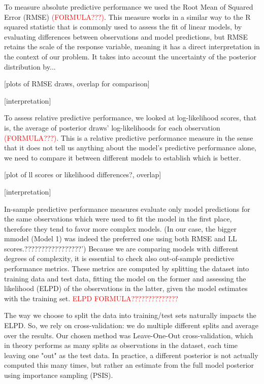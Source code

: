 \documentclass[12pt]{article}
\begin{document}
To measure absolute predictive performance we used the Root Mean of Squared Error (RMSE)
\textcolor{red}{(FORMULA???)}.
This measure works in a similar way to the R squared statistic that is commonly used to assess the fit of linear models, by evaluating differences between observations and model predictions, but RMSE retains the scale of the response variable, meaning it has a direct interpretation in the context of our problem.
It takes into account the uncertainty of the posterior distribution by...


[plots of RMSE draws, overlap for comparison]

[interpretation]



To assess relative predictive performance, we looked at log-likelihood scores, that is, the average of posterior draws' log-likelihoods for each observation
\textcolor{red}{(FORMULA???)}. 
This is a relative predictive performance measure in the sense that it does not tell us anything about the model's predictive performance alone, we need to compare it between different models to establish which is better.
 

[plot of ll scores or likelihood differences?, overlap]

[interpretation]



In-sample predictive performance measures evaluate only model predictions for the same observations which were used to fit the model in the first place, therefore they tend to favor more complex models.
(In our case, the bigger mmodel (Model 1) was indeed the preferred one using both RMSE and LL scores.?????????????????')
Because we are comparing models with different degrees of complexity, it is essential to check also out-of-sample predictive performance metrics. These metrics are computed by splitting the dataset into training data and test data, fitting the model on the former and assessing the likelihood (ELPD) of the observations in the latter, given the model estimates with the training set.
\textcolor{red}{ELPD FORMULA??????????????}

The way we choose to split the data into training/test sets naturally impacts the ELPD. So, we rely on cross-validation: we do multiple different splits and average over the results. Our chosen method was Leave-One-Out cross-validation, which in theory performs as many splits as observations in the dataset, each time leaving one "out" as the test data. In practice, a different posterior is not actually computed this many times, but rather an estimate from the full model posterior using importance sampling (PSIS).
\end{document}
